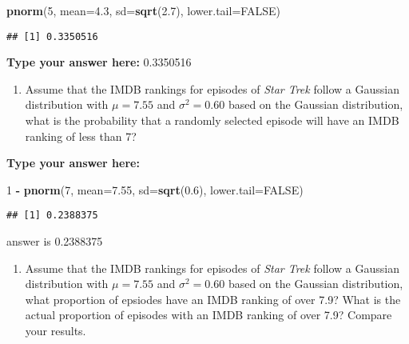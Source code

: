 \documentclass[
]{article}
\newenvironment{Shaded}{\begin{snugshade}}{\end{snugshade}}
\newcommand{\DataTypeTok}[1]{\textcolor[rgb]{0.13,0.29,0.53}{#1}}
\newcommand{\DecValTok}[1]{\textcolor[rgb]{0.00,0.00,0.81}{#1}}
\newcommand{\FloatTok}[1]{\textcolor[rgb]{0.00,0.00,0.81}{#1}}
\newcommand{\KeywordTok}[1]{\textcolor[rgb]{0.13,0.29,0.53}{\textbf{#1}}}
\newcommand{\NormalTok}[1]{#1}
\newcommand{\OperatorTok}[1]{\textcolor[rgb]{0.81,0.36,0.00}{\textbf{#1}}}
\newcommand{\OtherTok}[1]{\textcolor[rgb]{0.56,0.35,0.01}{#1}}
\newcommand{\StringTok}[1]{\textcolor[rgb]{0.31,0.60,0.02}{#1}}
\providecommand{\tightlist}{%
  \setlength{\itemsep}{0pt}\setlength{\parskip}{0pt}}
\begin{document}
\begin{Shaded}
\begin{Highlighting}[]
\KeywordTok{pnorm}\NormalTok{(}\DecValTok{5}\NormalTok{, }\DataTypeTok{mean=}\FloatTok{4.3}\NormalTok{, }\DataTypeTok{sd=}\KeywordTok{sqrt}\NormalTok{(}\FloatTok{2.7}\NormalTok{), }\DataTypeTok{lower.tail=}\OtherTok{FALSE}\NormalTok{)}
\end{Highlighting}
\end{Shaded}

\begin{verbatim}
## [1] 0.3350516
\end{verbatim}

\textbf{Type your answer here:} 0.3350516

\begin{enumerate}
\def\labelenumi{\alph{enumi}.}
\setcounter{enumi}{2}
\tightlist
\item
  Assume that the IMDB rankings for episodes of \emph{Star Trek} follow
  a Gaussian distribution with \(\mu = 7.55\) and \(\sigma^2=0.60\)
  based on the Gaussian distribution, what is the probability that a
  randomly selected episode will have an IMDB ranking of less than 7?
\end{enumerate}

\textbf{Type your answer here:}

\begin{Shaded}
\begin{Highlighting}[]
\DecValTok{1} \OperatorTok{-}\StringTok{ }\KeywordTok{pnorm}\NormalTok{(}\DecValTok{7}\NormalTok{, }\DataTypeTok{mean=}\FloatTok{7.55}\NormalTok{, }\DataTypeTok{sd=}\KeywordTok{sqrt}\NormalTok{(}\FloatTok{0.6}\NormalTok{), }\DataTypeTok{lower.tail=}\OtherTok{FALSE}\NormalTok{)}
\end{Highlighting}
\end{Shaded}

\begin{verbatim}
## [1] 0.2388375
\end{verbatim}

answer is 0.2388375

\begin{enumerate}
\def\labelenumi{\alph{enumi}.}
\setcounter{enumi}{3}
\tightlist
\item
  Assume that the IMDB rankings for episodes of \emph{Star Trek} follow
  a Gaussian distribution with \(\mu = 7.55\) and \(\sigma^2=0.60\)
  based on the Gaussian distribution, what proportion of epsiodes have
  an IMDB ranking of over 7.9? What is the actual proportion of episodes
  with an IMDB ranking of over 7.9? Compare your results.
\end{enumerate}
\end{document}
